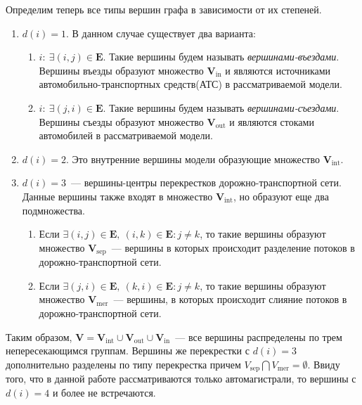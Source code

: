 Определим теперь все типы вершин графа в зависимости от их степеней.
\begin{enumerate}
  \item \(d(i) = 1\). В данном случае существует два варианта:
  \begin{enumerate}
    \item \(i:\ \exists (i,j)\in \mathbf{E}\). Такие вершины будем называть \emph{вершинами-въездами}. Вершины въезды образуют множество \(\mathbf{V}_\text{in}\) и являются источниками автомобильно-транспортных средств(АТС) в рассматриваемой модели.
    \item \(i:\ \exists (j,i)\in \mathbf{E}\). Такие вершины будем называть \emph{вершинами-съездами}. Вершины съезды образуют множество \(\mathbf{V}_\text{out}\) и являются стоками автомобилей в рассматриваемой модели.
  \end{enumerate}
  \item \(d(i) = 2\). Это внутренние вершины модели образующие множество \(\mathbf{V}_\text{int}\).
  \item \(d(i) = 3\)~--- вершины-центры перекрестков дорожно-транспортной сети. Данные вершины также входят в множество \(\mathbf{V}_\text{int}\), но образуют еще два подмножества.
  \begin{enumerate}
    \item Если \(\exists (i, j) \in \mathbf{E},\ (i, k) \in \mathbf{E} : j\neq k \), то такие вершины образуют множество \(\mathbf{V}_\text{sep}\)~--- вершины в которых происходит разделение потоков в дорожно-транспортной сети.
    \item Если \(\exists (j, i) \in \mathbf{E},\ (k, i) \in \mathbf{E} : j\neq k \), то такие вершины образуют множество \(\mathbf{V}_\text{mer}\)~--- вершины, в которых происходит слияние потоков в дорожно-транспортной сети.
  \end{enumerate}
\end{enumerate}
Таким образом, \(\mathbf{V} = \mathbf{V}_\text{int} \cup \mathbf{V}_\text{out} \cup \mathbf{V}_\text{in}\)~--- все вершины распределены по трем непересекающимся группам. Вершины же перекрестки с \(d(i) = 3\) дополнительно разделены по типу перекрестка причем \(V_\text{sep}\bigcap V_\text{mer} = \emptyset\). Ввиду того, что в данной работе рассматриваются только автомагистрали, то вершины с \(d(i) = 4\) и более не встречаются.

